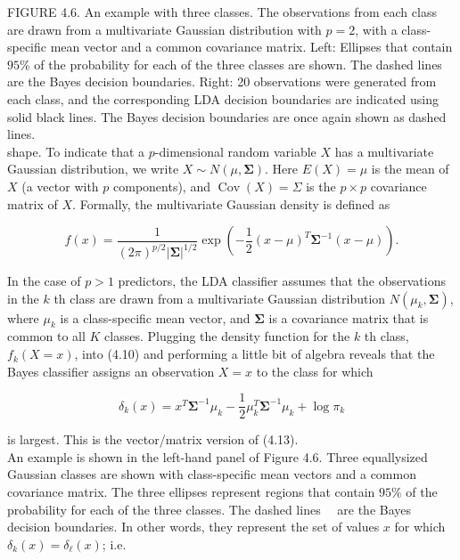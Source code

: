 \documentclass[10pt]{article}
\begin{document}
FIGURE 4.6. An example with three classes. The observations from each class are drawn from a multivariate Gaussian distribution with $p=2$, with a class-specific mean vector and a common covariance matrix. Left: Ellipses that contain $95 \%$ of the probability for each of the three classes are shown. The dashed lines are the Bayes decision boundaries. Right: 20 observations were generated from each class, and the corresponding LDA decision boundaries are indicated using solid black lines. The Bayes decision boundaries are once again shown as dashed lines.\\
shape. To indicate that a $p$-dimensional random variable $X$ has a multivariate Gaussian distribution, we write $X \sim N(\mu, \boldsymbol{\Sigma})$. Here $E(X)=\mu$ is the mean of $X$ (a vector with $p$ components), and $\operatorname{Cov}(X)=\Sigma$ is the $p \times p$ covariance matrix of $X$. Formally, the multivariate Gaussian density is defined as


\begin{equation*}
f(x)=\frac{1}{(2 \pi)^{p / 2}|\boldsymbol{\Sigma}|^{1 / 2}} \exp \left(-\frac{1}{2}(x-\mu)^{T} \boldsymbol{\Sigma}^{-1}(x-\mu)\right) . \tag{4.18}
\end{equation*}


In the case of $p>1$ predictors, the LDA classifier assumes that the observations in the $k$ th class are drawn from a multivariate Gaussian distribution $N\left(\mu_{k}, \boldsymbol{\Sigma}\right)$, where $\mu_{k}$ is a class-specific mean vector, and $\boldsymbol{\Sigma}$ is a covariance matrix that is common to all $K$ classes. Plugging the density function for the $k$ th class, $f_{k}(X=x)$, into (4.10) and performing a little bit of algebra reveals that the Bayes classifier assigns an observation $X=x$ to the class for which


\begin{equation*}
\delta_{k}(x)=x^{T} \boldsymbol{\Sigma}^{-1} \mu_{k}-\frac{1}{2} \mu_{k}^{T} \boldsymbol{\Sigma}^{-1} \mu_{k}+\log \pi_{k} \tag{4.19}
\end{equation*}


is largest. This is the vector/matrix version of (4.13).\\
An example is shown in the left-hand panel of Figure 4.6. Three equallysized Gaussian classes are shown with class-specific mean vectors and a common covariance matrix. The three ellipses represent regions that contain $95 \%$ of the probability for each of the three classes. The dashed lines\
\
are the Bayes decision boundaries. In other words, they represent the set of values $x$ for which $\delta_{k}(x)=\delta_{\ell}(x)$; i.e.
\end{document}
